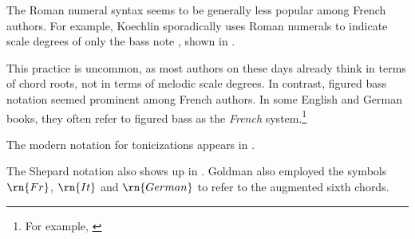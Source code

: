 The Roman numeral syntax seems to be generally less popular
among French authors. For example, Koechlin sporadically
uses Roman numerals to indicate scale degrees of only the
bass note \textcite{koechlin1928traite}, shown in
.


This practice is uncommon, as most authors on these days
already think in terms of chord roots, not in terms of
melodic scale degrees. In contrast, figured bass notation
seemed prominent among French authors. In some English and
German books, they often refer to figured bass as the
\emph{French} system.\footnote{For example,
\textcite{norris1894practical}}

The modern notation for tonicizations appears in
\textcite{tischler1964practical}.

The Shepard notation also shows up in
\textcite{goldman1965harmony}. Goldman also employed the
symbols $\rn{Fr}$, $\rn{It}$ and $\rn{German}$ to refer to
the augmented sixth chords.
